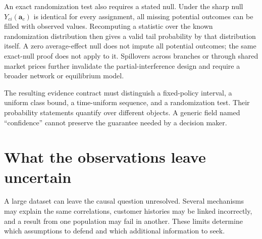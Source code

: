 An exact randomization test also requires a stated null. Under the
sharp null $Y_{ci}(\mathbf a_c)$ is identical for every assignment,
all missing potential outcomes can be filled with observed values.
Recomputing a statistic over the known randomization distribution
then gives a valid tail probability by that distribution itself.
A zero average-effect null does not impute all potential outcomes;
the same exact-null proof does not apply to it. Spillovers across
branches or through shared market prices further invalidate the
partial-interference design and require a broader network or
equilibrium model.

The resulting evidence contract must distinguish a fixed-policy
interval, a uniform class bound, a time-uniform sequence, and a
randomization test. Their probability statements quantify over
different objects. A generic field named ``confidence'' cannot
preserve the guarantee needed by a decision maker.



\part{What the observations leave uncertain}
\label{reading:part-uncertainty}
A large dataset can leave the causal question unresolved. Several mechanisms
may explain the same correlations, customer histories may be linked incorrectly,
and a result from one population may fail in another. These limits determine
which assumptions to defend and which additional information to seek.


